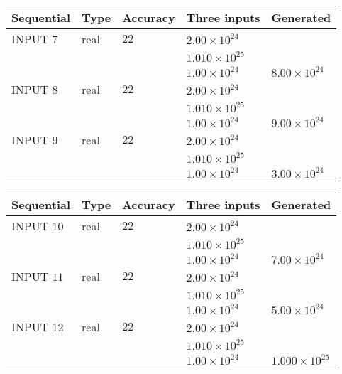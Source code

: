 \documentclass[12pt]{article}
\begin{document}
   
  
  
\noindent\begin{tabular}{|l|l|l|l|l|}
\hline
 Sequential & Type & Accuracy & Three inputs & Generated \\ 
\hline
 
 
  INPUT $            7 $ & real & $           22  $ & $
 2.00 \times 10^{24}
  $ & \\
  & & &  $
 1.010 \times 10^{25}
  $ & \\
  & & &  $
 1.00 \times 10^{24}
 $ & $ 8.00 \times 10^{24} $ 
 \\  \hline  
 
 
  INPUT $            8 $ & real & $           22  $ & $
 2.00 \times 10^{24}
  $ & \\
  & & &  $
 1.010 \times 10^{25}
  $ & \\
  & & &  $
 1.00 \times 10^{24}
 $ & $ 9.00 \times 10^{24} $ 
 \\  \hline  
 
 
  INPUT $            9 $ & real & $           22  $ & $
 2.00 \times 10^{24}
  $ & \\
  & & &  $
 1.010 \times 10^{25}
  $ & \\
  & & &  $
 1.00 \times 10^{24}
 $ & $ 3.00 \times 10^{24} $ 
 \\  \hline  
 \end{tabular}
   
   
  
  
\noindent\begin{tabular}{|l|l|l|l|l|}
\hline
 Sequential & Type & Accuracy & Three inputs & Generated \\ 
\hline
 
 
  INPUT $           10 $ & real & $           22  $ & $
 2.00 \times 10^{24}
  $ & \\
  & & &  $
 1.010 \times 10^{25}
  $ & \\
  & & &  $
 1.00 \times 10^{24}
 $ & $ 7.00 \times 10^{24} $ 
 \\  \hline  
 
 
  INPUT $           11 $ & real & $           22  $ & $
 2.00 \times 10^{24}
  $ & \\
  & & &  $
 1.010 \times 10^{25}
  $ & \\
  & & &  $
 1.00 \times 10^{24}
 $ & $ 5.00 \times 10^{24} $ 
 \\  \hline  
 
 
  INPUT $           12 $ & real & $           22  $ & $
 2.00 \times 10^{24}
  $ & \\
  & & &  $
 1.010 \times 10^{25}
  $ & \\
  & & &  $
 1.00 \times 10^{24}
 $ & $ 1.000 \times 10^{25} $ 
 \\  \hline  
 \end{tabular}
   
\end{document}

